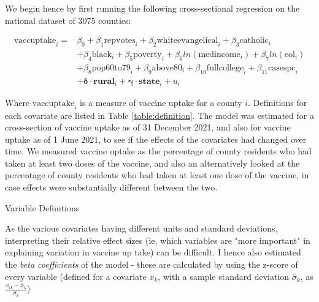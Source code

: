 \documentclass[12pt]{article}
\begin{document}
\begin{spacing}{1.5}
		We begin hence by first running the following cross-sectional regression on the national dataset of 3075 counties:
		
		\begin{equation} \label{eq:crosssection}
			\begin{split}
				\textrm{vaccuptake}_i = &\beta_0 + \beta_1 \textrm{repvotes}_i + \beta_2 \textrm{whiteevangelical}_i + \beta_3 \textrm{catholic}_i \\ 
				&+ \beta_4 \textrm{black}_i + \beta_5 \textrm{poverty}_i + \beta_6 ln(\textrm{medincome}_i) + \beta_7 ln(\textrm{col}_i) \\ 
				&+ \beta_8 \textrm{pop60to79}_i + \beta_9 \textrm{above80}_i + \beta_{10} \textrm{fullcollege}_i + \beta_{11} \textrm{casespc}_i \\
				&+\boldsymbol{\delta}\cdot \mathbf{rural}_i + \boldsymbol{\gamma}\cdot \mathbf{state}_i + u_i
			\end{split}
		\end{equation}
		
		Where $\textrm{vaccuptake}_i$ is a measure of vaccine uptake for a county $i$. Definitions for each covariate are listed in Table \ref{table:definition}. The model was estimated for a cross-section of vaccine uptake as of 31 December 2021, and also for vaccine uptake as of 1 June 2021, to see if the effects of the covariates had changed over time. We measured vaccine uptake as the percentage of county residents who had taken at least two doses of the vaccine, and also an alternatively looked at the percentage of county residents who had taken at least one dose of the vaccine, in case effects were substantially different between the two.
		
		\begin{table}
			\caption{Variable Definitions}
			
			\label{table:definition}
		\end{table}
	
		As the various covariates having different units and standard deviations, interpreting their relative effect sizes (ie, which variables are "more important" in explaining variation in vaccine up take) can be difficult. I hence also estimated the \textit{beta coefficients} of the model - these are calculated by using the z-score of every variable (defined for a covariate $x_k$, with a sample standard deviation $\hat{\sigma}_k$, as $\frac{x_{ik}-\bar{x}_k}{\hat{\sigma}_k}$)
		

\end{spacing}
\end{document}
